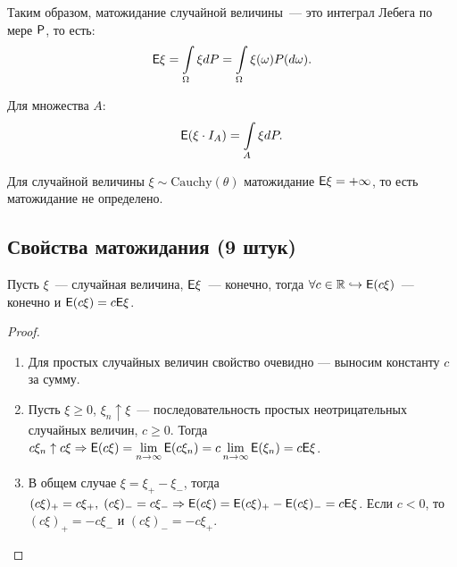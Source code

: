 \begin{statement}
    Таким образом, матожидание случайной величины~--- это интеграл Лебега по мере $\P$, то есть: $$ \E\xi = \int\limits_\Omega \xi dP = \int\limits_\Omega \xi(\omega)P(d\omega).$$

    Для множества $A$:
    $$ \E(\xi\cdot I_A) = \int\limits_A \xi dP. $$
\end{statement}

    Для случайной величины $\xi \sim \text{Cauchy}(\theta)$ матожидание $\E\xi = +\infty$, то есть матожидание не определено.

\subsection{Свойства матожидания (9 штук)}
\begin{property}
	Пусть $\xi$~--- случайная величина, $\E \xi$~--- конечно, тогда $\forall c \in \R \hookrightarrow \E(c\xi)$~--- конечно и $\E(c\xi) = c\E\xi$.
	\begin{proof}
	    \begin{enumerate}
    	    \item Для простых случайных величин свойство очевидно --- выносим константу $c$ за сумму. 
    		
    		\item Пусть $\xi \geqslant 0$, $\xi_n \uparrow \xi$~--- последовательность простых неотрицательных случайных величин, $c \geqslant 0$. Тогда $c\xi_n \uparrow c\xi \Rightarrow \E(c\xi) = \lim\limits_{n \rightarrow \infty} \E(c\xi_n) = c \lim\limits_{n \rightarrow \infty} \E(\xi_n) = c\E\xi$. 
    		
    		\item В общем случае $\xi = \xi_+ - \xi_-$, тогда $(c\xi)_+ = c\xi_+,\; (c\xi)_- = c\xi_- \Rightarrow \E(c\xi) = \E(c\xi)_+ - \E(c\xi)_- = c\E\xi$. Если $c < 0$, то $(c\xi)_+ = -c\xi_-$ и $(c\xi)_- = -c\xi_+$.
	    \end{enumerate}
	\end{proof}
\end{property}


